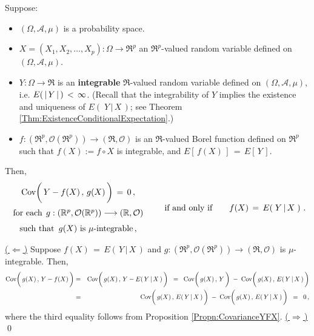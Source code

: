 \begin{theorem}
\mbox{}
\vskip 0.2cm
\noindent
Suppose:
\begin{itemize}
\item
	$(\Omega,\mathcal{A},\mu)$ is a probability space.
\item
	$X = (X_{1}, X_{2}, \ldots, X_{p}) : \Omega \longrightarrow \Re^{p}$ an $\Re^{p}$-valued random variable
	defined on $(\Omega,\mathcal{A},\mu)$.
\item
	$Y : \Omega \longrightarrow \Re$ is an \textbf{\color{red}integrable} $\Re$-valued random variable
	defined on $(\Omega,\mathcal{A},\mu)$,
	i.e. $E(\,\vert\,\overset{{\color{white}.}}{Y}\,\vert\,)\,<\,\infty$.
	\vskip 0.01cm
	(Recall that the integrability of $Y$ implies the existence and uniqueness of $E\!\left(\;Y\,\vert\,X\,\right)$;
	see Theorem \ref{Thm:ExistenceConditionalExpectation}.)
\item
	$f : (\Re^{p},\mathcal{O}(\Re^{p})) \longrightarrow (\Re,\mathcal{O})$ is an $\Re$-valued Borel function
	defined on $\Re^{p}$ such that $f(X) := f\circ X$ is integrable, and $E\!\left[\,f(X)\,\right] \,=\, E\!\left[\,Y\,\right]$.
\end{itemize}
Then,
\begin{equation*}
	\begin{array}{c}
	\Cov\!\left(\,Y-f(X)\,,\,\overset{{\color{white}\vert}}{g}(X)\,\right) \,=\, 0\,,
	\\
	\overset{{\color{white}-}}{\textnormal{for each}\;\, g : (\Re^{p},\mathcal{O}(\Re^{p}))\longrightarrow (\Re,\mathcal{O})}
	\\
	\overset{{\color{white}-}}{\textnormal{such that \,$g(X)$ is $\mu$-integrable}}
	\,,
	\end{array}
	\quad\quad\textnormal{if and only if}\quad\quad
	f(X) \,=\, E\!\left(\;Y\,\vert\,X\;\right)\,.
\end{equation*}
\end{theorem}
\proof
\vskip 0.1cm
\noindent
\underline{(\,$\Longleftarrow$\,)}\quad
Suppose $f(X) \,=\, E\!\left(\,Y\,\vert\,X\,\right)$ and
$g : (\Re^{p},\mathcal{O}(\Re^{p}))\longrightarrow (\Re,\mathcal{O})$
is $\mu$-integrable.
Then,
\begin{eqnarray*}
\Cov\!\left(\,\overset{{\color{white}\vert}}{g}(X)\,,\,Y-f(X)\,\right)
&=&
	\Cov\!\left(\,\overset{{\color{white}\vert}}{g}(X)\,,\,Y-E\!\left(\,Y\,\vert\,X\,\right)\,\right)
\;\;=\;\;
	\Cov\!\left(\,\overset{{\color{white}\vert}}{g}(X)\,,\,Y\,\right)
	\; - \;
	\Cov\!\left(\,\overset{{\color{white}\vert}}{g}(X)\,,\,E\!\left(\,Y\,\vert\,X\,\right)\,\right)
\\
&=&
	\Cov\!\left(\,\overset{{\color{white}\vert}}{g}(X)\,,\,E\!\left(\,Y\,\vert\,X\,\right)\,\right)
	\; - \;
	\Cov\!\left(\,\overset{{\color{white}\vert}}{g}(X)\,,\,E\!\left(\,Y\,\vert\,X\,\right)\,\right)
\;\;=\;\;
	0\,,
\end{eqnarray*}
where the third equality follows from Proposition \ref{Propn:CovarianceYFX}.
\vskip 0.3cm
\noindent
\underline{(\,$\Longrightarrow$\,)}\quad
\qed

